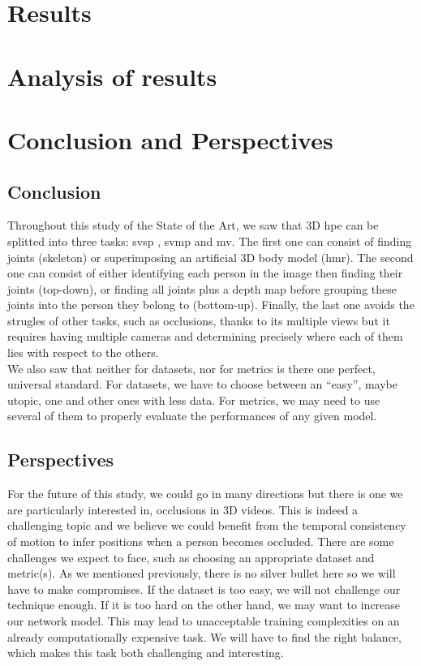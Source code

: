 \documentclass[runningheads]{llncs}
\begin{document}
\section{Results}
\section{Analysis of results}
\section{Conclusion and Perspectives}
\subsection{Conclusion}
Throughout this study of the State of the Art, we saw that 3D \ac{hpe} can be splitted into three tasks: \ac{svsp} , \ac{svmp} and \ac{mv}. The first one can consist of finding joints (skeleton) or superimposing an artificial 3D body model (\ac{hmr}). The second one can consist of either identifying each person in the image then finding their joints (top-down), or finding all joints plus a depth map before grouping these joints into the person they belong to (bottom-up). Finally, the last one avoids the strugles of other tasks, such as occlusions, thanks to its multiple views but it requires having multiple cameras and determining precisely where each of them lies with respect to the others. \\
We also saw that neither for datasets, nor for metrics is there one perfect, universal standard. For datasets, we have to choose between an ``easy'', maybe utopic, one and other ones with less data. For metrics, we may need to use several of them to properly evaluate the performances of any given model.


\subsection{Perspectives}
For the future of this study, we could go in many directions but there is one we are particularly interested in, occlusions in 3D videos. This is indeed a challenging topic and we believe we could benefit from the temporal consistency of motion to infer positions when a person becomes occluded. There are some challenges we expect to face, such as choosing an appropriate dataset and metric(s). As we mentioned previously, there is no silver bullet here so we will have to make compromises. If the dataset is too easy, we will not challenge our technique enough. If it is too hard on the other hand, we may want to increase our network model. This may lead to unacceptable training complexities on an already computationally expensive task. We will have to find the right balance, which makes this task both challenging and interesting.
\end{document}
